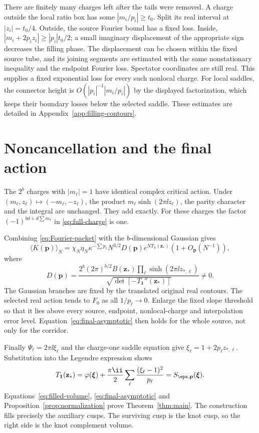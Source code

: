 There are finitely many charges left after the tails were removed. A charge outside the local ratio box has some $|m_i/p_i|\ge t_0$. Split its real interval at $|z_i|=t_0/4$. Outside, the source Fourier bound has a fixed loss. Inside,
$|m_i+2p_i z_i|\ge |p_i|t_0/2$; a small imaginary displacement of the appropriate sign decreases the filling phase. The displacement can be chosen within the fixed source tube, and its joining segments are estimated with the same nonstationary inequality and the endpoint Fourier loss. Spectator coordinates are still real. This supplies a fixed exponential loss for every such nonlocal charge. For local saddles, the connector height is $O(|p_i|^{-1}|m_i/p_i|)$ by the displayed factorization, which keeps their boundary losses below the selected saddle. These estimates are detailed in Appendix~\ref{app:filling-contours}.

\section{Noncancellation and the final action}
The $2^b$ charges with $|m_\ell|=1$ have identical complex critical action. Under $(m_\ell,z_\ell)\mapsto(-m_\ell,-z_\ell)$, the product $m_\ell\sinh(2\pi\ii z_\ell)$, the parity character and the integral are unchanged. They add exactly. For these charges the factor $(-1)^{bd+d\sum m_\ell}$ in \eqref{eq:full-charge} is one.

Combining \eqref{eq:Fourier-packet} with the $b$-dimensional Gaussian gives
\begin{equation}\label{eq:final-asymptotic}
 \langle K(\mathbf p)\rangle_N
 =\chi_N\eta_N\kappa^{-\sum p_\ell}N^{3/2}
 D(\mathbf p)e^{NT_{\mathbf1}(\mathbf z_*)}
 (1+O_{\mathbf p}(N^{-1})),
\end{equation}
where
\begin{equation}\label{eq:final-amplitude}
 D(\mathbf p)=
 \frac{2^b(2\pi)^{b/2}B(\mathbf z_*)
 \prod_\ell\sinh(2\pi\ii z_{*,\ell})}
 {\sqrt{\det[-T_{\mathbf1}''(\mathbf z_*)]}}\ne0.
\end{equation}
The Gaussian branches are fixed by the translated original real contours. The selected real action tends to $F_0$ as all $1/p_\ell\to0$. Enlarge the fixed slope threshold so that it lies above every source, endpoint, nonlocal-charge and interpolation error level. Equation~\eqref{eq:final-asymptotic} then holds for the whole source, not only for the corridor.

Finally $\Psi_\ell=2\pi\ii\xi_\ell$ and the charge-one saddle equation give $\xi_\ell=1+2p_\ell z_{*,\ell}$. Substitution into the Legendre expression shows
\[
 T_{\mathbf1}(\mathbf z_*)
 =\varphi(\boldsymbol\xi)+\frac{\pi\ii}{2}
 \sum_\ell\frac{(\xi_\ell-1)^2}{p_\ell}
 =S_{\eps,\mathbf p}(\boldsymbol\xi).
\]
Equations~\eqref{eq:filled-volume}, \eqref{eq:final-asymptotic} and Proposition~\ref{prop:normalization} prove Theorem~\ref{thm:main}. The construction fills precisely the auxiliary cusps. The surviving cusp is the knot cusp, so the right side is the knot complement volume.
